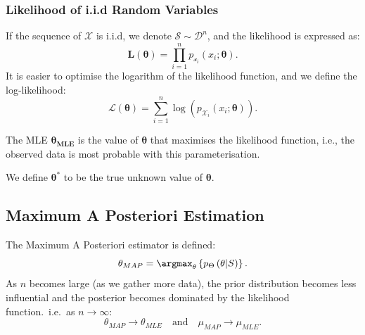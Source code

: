 \subsubsection{Likelihood of i.i.d Random Variables}
If the sequence of $\boldsymbol{\mathcal{X}}$ is i.i.d, we denote
$\mathcal{S}\sim\mathcal{D}^{n}$, and the likelihood is expressed as:
\[\mathbf{L}(\boldsymbol{\theta})=\prod_{i=1}^{n} p_{\mathcal{x}_i}(x_i;\boldsymbol{\theta}).\] 
It is easier to optimise the logarithm of the likelihood function, and we
define the log-likelihood:
\[\boldsymbol{\mathcal{L}}(\boldsymbol{\theta})=\sum_{i=1}^{n} \log\left(p_{\mathcal{X}_i}\left(x_i;\boldsymbol{\theta}\right)\right).\] 
\begin{definition}
  The MLE $\boldsymbol{\theta_{MLE}}$ is the value of $\boldsymbol{\theta}$
  that maximises the likelihood function, i.e., the observed data is most
  probable with this parameterisation.
\end{definition}
\begin{notation}[$\boldsymbol{\theta}^{*}$]
  We define $\boldsymbol{\theta}^{*}$ to be the true unknown value of
  $\boldsymbol{\theta}$.
\end{notation}

\subsection{Maximum A Posteriori Estimation}
The Maximum A Posteriori estimator is defined:
\[\theta_{MAP}=\argmax_\theta \left\{ p_\Theta\left( \theta|S \right)  \right\}.\] 
As $n$ becomes large (as we gather more data), the prior distribution becomes less influential and
the posterior becomes dominated by the likelihood function.\ i.e.\ as $n \to\infty$:
\[\theta_{MAP}\to\theta_{MLE}\quad\text{and}\quad\mu_{MAP}\to\mu_{MLE}.\] 
